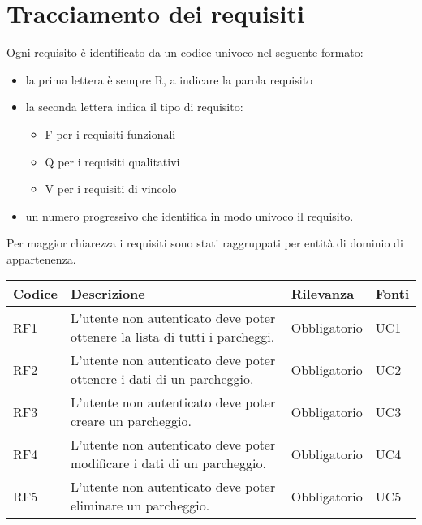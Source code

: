 \section{Tracciamento dei requisiti}
Ogni requisito è identificato da un codice univoco nel seguente formato:
\begin{itemize}
    \item la prima lettera è sempre R, a indicare la parola requisito
    \item la seconda lettera indica il tipo di requisito:
    \begin{itemize}
        \item F per i requisiti funzionali
        \item Q per i requisiti qualitativi
        \item V per i requisiti di vincolo
    \end{itemize}
    \item un numero progressivo che identifica in modo univoco il requisito.
\end{itemize}
Per maggior chiarezza i requisiti sono stati raggruppati per entità di dominio di appartenenza.

\leavevmode\newline
\begin{table}
    \begin{tabular}{|p{1cm}|p{6cm}|p{1.9cm}|p{1cm}|} 
    \hline
    Codice & Descrizione & Rilevanza &  Fonti \\ 
    \hline
    RF1 & L'utente non autenticato deve poter ottenere la lista di tutti i parcheggi. & Obbligatorio & UC1 \\ 
    \hline
    RF2 & L'utente non autenticato deve poter ottenere i dati di un parcheggio. & Obbligatorio & UC2 \\ 
    \hline
    RF3 & L'utente non autenticato deve poter creare un parcheggio. & Obbligatorio & UC3 \\ 
    \hline
    RF4 & L'utente non autenticato deve poter modificare i dati di un parcheggio. & Obbligatorio & UC4 \\
    \hline
    RF5 & L'utente non autenticato deve poter eliminare un parcheggio. & Obbligatorio & UC5 \\ 
    \hline
    \end{tabular}
\end{table}

